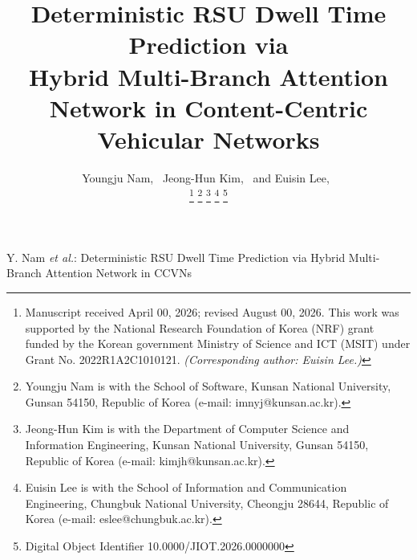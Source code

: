 \documentclass[journal]{IEEEtran}
\begin{document}
\title{Deterministic RSU Dwell Time Prediction via\\Hybrid Multi-Branch Attention Network in Content-Centric Vehicular Networks}

\newcommand{\orcidauthorA}{0000-0003-3971-0715} %
\newcommand{\orcidauthorB}{0000-0001-8209-5944} %
\newcommand{\orcidauthorC}{0000-0002-0422-0647} %

\author{Youngju Nam,~
        Jeong-Hun Kim,~
        and Euisin Lee,~

\thanks{Manuscript received April 00, 2026; revised August 00, 2026.
This work was supported by the National Research Foundation of Korea (NRF) grant funded by the Korean government Ministry of Science and ICT (MSIT) under Grant No. 2022R1A2C1010121.
\textit{(Corresponding author: Euisin Lee.)}}
\thanks{Youngju Nam is with the School of Software, Kunsan National University,
Gunsan 54150, Republic of Korea (e-mail: imnyj@kunsan.ac.kr).}
\thanks{Jeong-Hun Kim is with the Department of Computer Science and Information Engineering,
Kunsan National University, Gunsan 54150, Republic of Korea (e-mail: kimjh@kunsan.ac.kr).}
\thanks{Euisin Lee is with the School of Information and Communication Engineering,
Chungbuk National University, Cheongju 28644, Republic of Korea (e-mail: eslee@chungbuk.ac.kr).}
\thanks{Digital Object Identifier 10.0000/JIOT.2026.0000000}}

%
{Y. Nam \MakeLowercase{\textit{et al.}}: Deterministic RSU Dwell Time Prediction via Hybrid Multi-Branch Attention Network in CCVNs}


\maketitle
\end{document}
